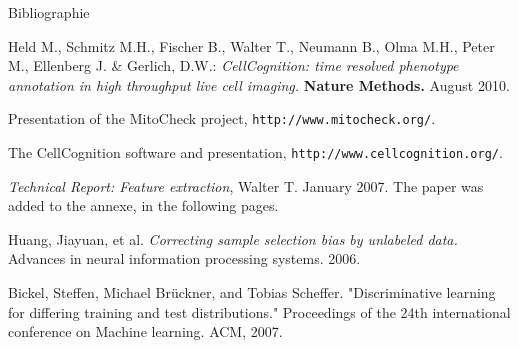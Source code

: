 \documentclass{beamer}
\begin{document}
\begin{frame}{Bibliographie}
\begin{thebibliography}{9}

 Held M., Schmitz M.H., Fischer B., Walter T., Neumann B., Olma M.H., Peter M., Ellenberg J. \& 
Gerlich, D.W.: \textit{CellCognition: time resolved phenotype annotation in high throughput live cell imaging.} \textbf{Nature Methods.} August 2010.


 Presentation of the MitoCheck project, \texttt{http://www.mitocheck.org/}.


 The CellCognition software and presentation, \texttt{http://www.cellcognition.org/}.


 \textit{Technical Report: Feature extraction}, Walter T. January 2007. The paper was added to the annexe, in the following pages.

 Huang, Jiayuan, et al. \textit{Correcting sample selection bias by unlabeled data.} Advances in neural information processing systems. 2006.

 Bickel, Steffen, Michael Brückner, and Tobias Scheffer. "Discriminative learning for differing training and test distributions." Proceedings of the 24th international conference on Machine learning. ACM, 2007.
\end{thebibliography}
\end{frame} 
\end{document}
